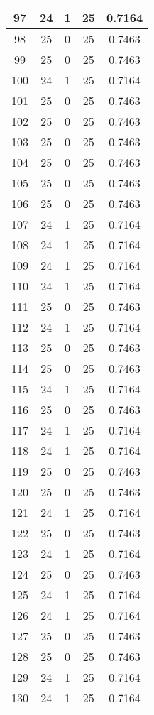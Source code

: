 \documentclass[letterpaper, 12pt]{article}
\begin{document}
\begin{longtable}{|c|c|c|c|c|}
\hline
97 & 24 & 1 & 25 & 0.7164 \\
\hline
98 & 25 & 0 & 25 & 0.7463 \\
\hline
99 & 25 & 0 & 25 & 0.7463 \\
\hline
100 & 24 & 1 & 25 & 0.7164 \\
\hline
101 & 25 & 0 & 25 & 0.7463 \\
\hline
102 & 25 & 0 & 25 & 0.7463 \\
\hline
103 & 25 & 0 & 25 & 0.7463 \\
\hline
104 & 25 & 0 & 25 & 0.7463 \\
\hline
105 & 25 & 0 & 25 & 0.7463 \\
\hline
106 & 25 & 0 & 25 & 0.7463 \\
\hline
107 & 24 & 1 & 25 & 0.7164 \\
\hline
108 & 24 & 1 & 25 & 0.7164 \\
\hline
109 & 24 & 1 & 25 & 0.7164 \\
\hline
110 & 24 & 1 & 25 & 0.7164 \\
\hline
111 & 25 & 0 & 25 & 0.7463 \\
\hline
112 & 24 & 1 & 25 & 0.7164 \\
\hline
113 & 25 & 0 & 25 & 0.7463 \\
\hline
114 & 25 & 0 & 25 & 0.7463 \\
\hline
115 & 24 & 1 & 25 & 0.7164 \\
\hline
116 & 25 & 0 & 25 & 0.7463 \\
\hline
117 & 24 & 1 & 25 & 0.7164 \\
\hline
118 & 24 & 1 & 25 & 0.7164 \\
\hline
119 & 25 & 0 & 25 & 0.7463 \\
\hline
120 & 25 & 0 & 25 & 0.7463 \\
\hline
121 & 24 & 1 & 25 & 0.7164 \\
\hline
122 & 25 & 0 & 25 & 0.7463 \\
\hline
123 & 24 & 1 & 25 & 0.7164 \\
\hline
124 & 25 & 0 & 25 & 0.7463 \\
\hline
125 & 24 & 1 & 25 & 0.7164 \\
\hline
126 & 24 & 1 & 25 & 0.7164 \\
\hline
127 & 25 & 0 & 25 & 0.7463 \\
\hline
128 & 25 & 0 & 25 & 0.7463 \\
\hline
129 & 24 & 1 & 25 & 0.7164 \\
\hline
130 & 24 & 1 & 25 & 0.7164 \\

\end{longtable}
\end{document}
